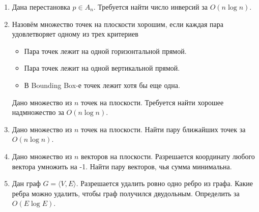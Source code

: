 \begin{enumerate}
  \item Дана перестановка $p \in A_n$. Требуется найти число инверсий за $O(n \log n)$.

  \item Назовём множество точек на плоскости хорошим, если каждая пара удовлетворяет
        одному из трех критериев
        \begin{itemize}
          \item Пара точек лежит на одной горизонтальной прямой.
          \item Пара точек лежит на одной вертикальной прямой.
          \item В Bounding Box-е точек лежит хотя бы еще одна.
        \end{itemize}
        Дано множество из $n$ точек на плоскости. Требуется
        найти хорошее надмножество за $O(n \log n)$.

  \item Дано множество из $n$ точек на плоскости. Найти пару
        ближайших точек за $O(n \log n)$.
  
  \item Дано множество из $n$ векторов на плоскости. Разрешается
      координату любого вектора умножить на -1. Найти пару
      векторов, чья сумма минимальна.


  \item Дан граф $G = \langle V, E \rangle$. Разрешается удалить
      ровно одно ребро из графа. Какие ребра можно удалить, чтобы
      граф получился двудольным. Определить за $O(E \log E)$.

\end{enumerate}
